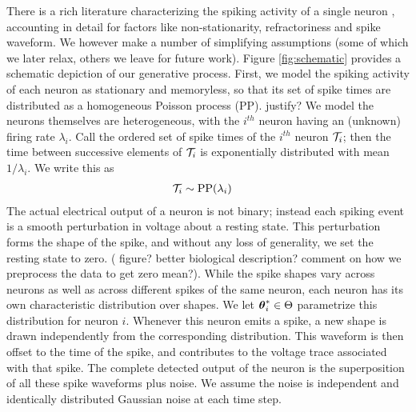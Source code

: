 There is a rich literature characterizing the spiking activity of a single neuron \citep{?}, accounting in detail for factors like non-stationarity, 
refractoriness and spike waveform. We however make a number of simplifying assumptions (some of which we later relax, others we leave
for future work). Figure \ref{fig:schematic} provides a schematic depiction of our generative process.
First, we model the spiking activity of each neuron as stationary and memoryless, so that its set of spike times are 
distributed as a homogeneous Poisson process (PP). 
{\color{red} justify?} We model the neurons themselves are heterogeneous, with the $i^{th}$ neuron having
an (unknown) firing rate $\lambda_i$. Call the ordered set of spike times of the $i^{th}$ neuron $\mathcal{T}_i$; then the time between successive elements of $\mathcal{T}_i$ is 
exponentially distributed with mean $1/\lambda_i$. We write this as
\begin{align}
  \mathcal{T}_i &\sim \text{PP}(\lambda_i)
\end{align}
The actual electrical output of a neuron is not binary; instead each spiking event is a smooth perturbation in voltage about a
resting state. This perturbation forms the shape of the spike, and without any loss of generality, we set the resting state to zero. 
{(\color{red} figure? better biological description? comment on how we preprocess the data to get zero mean?)}. 
While the spike shapes vary across neurons as well as across different spikes of the same neuron, each 
neuron has its own characteristic distribution over shapes. 
We let $\boldsymbol{\theta}^*_i \in \Theta$ parametrize this distribution for neuron $i$.
Whenever this neuron emits a 
spike, a new shape is drawn independently from the corresponding distribution. %
This waveform is then offset to the time of the spike, and contributes to the voltage trace associated with that spike. The complete detected output of the neuron is the 
superposition of all these spike waveforms plus noise.  
We assume the noise is independent and  identically distributed Gaussian noise at each time step.

